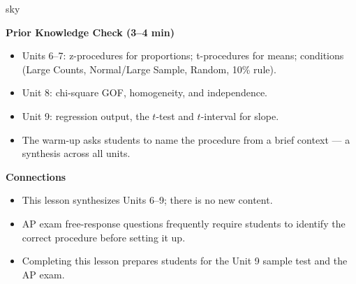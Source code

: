 \documentclass[10pt]{article}
\begin{document}
\begin{skillbox}{sky}
\begin{minipage}[t]{0.48\linewidth}
    \textbf{Prior Knowledge Check (3--4 min)}
    \begin{itemize}
        \item Units 6--7: z-procedures for proportions; t-procedures for means;
              conditions (Large Counts, Normal/Large Sample, Random, 10\% rule).
        \item Unit 8: chi-square GOF, homogeneity, and independence.
        \item Unit 9: regression output, the $t$-test and $t$-interval for slope.
        \item The warm-up asks students to name the procedure from a brief context ---
              a synthesis across all units.
    \end{itemize}
\end{minipage}
\hfill
\begin{minipage}[t]{0.48\linewidth}
    \textbf{Connections}
    \begin{itemize}
        \item This lesson synthesizes Units 6--9; there is no new content.
        \item AP exam free-response questions frequently require students to identify
              the correct procedure before setting it up.
        \item Completing this lesson prepares students for the Unit 9 sample test
              and the AP exam.
    \end{itemize}
\end{minipage}
\end{skillbox}
\end{document}
